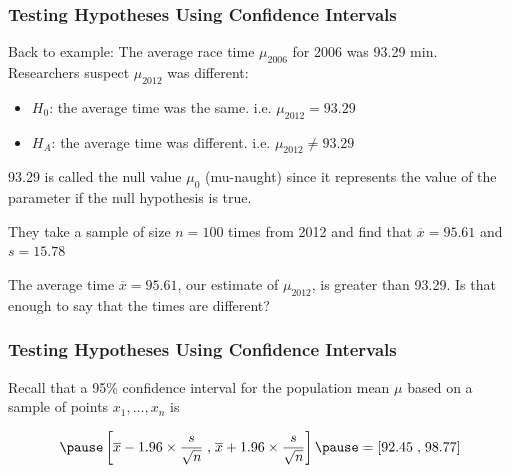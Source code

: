 \documentclass[handout]{beamer}
\newcommand{\blue}[1]{\textcolor{blue2}{#1}}
\newcommand{\xbar}{\overline{x}}
\begin{document}
\begin{frame}
\frametitle{Testing Hypotheses Using Confidence Intervals}

Back to example:  The average race time $\mu_{2006}$ for 2006 was 93.29 min.  Researchers suspect $\mu_{2012}$ was different:
\begin{itemize}
\pause \item $H_0$: the average time was the same. i.e. $\mu_{2012} = 93.29$
\pause \item $H_A$: the average time was different. i.e. $\mu_{2012} \neq 93.29$
\end{itemize}

\pause \vspace{0.5cm}

93.29 is called the \blue{null value $\mu_{0}$} (mu-naught) since it represents the value of the parameter if the null hypothesis is true.

\pause \vspace{0.5cm}

They take a sample of size $n=100$ times from 2012 and find that $\xbar=95.61$ and $s=15.78$

\pause \vspace{0.5cm}

The average time $\xbar=95.61$, our estimate of $\mu_{2012}$, is greater than 93.29.  Is that enough to say that the times are different?

\end{frame}


\begin{frame}
\frametitle{Testing Hypotheses Using Confidence Intervals}

Recall that a 95\% confidence interval for the population mean $\mu$ based on a sample of points $x_1, \ldots, x_n$ is 

\begin{eqnarray*}
\pause \left[\overline{x} - 1.96 \times\frac{s}{\sqrt n}\right.,
\left.\overline{x} + 1.96 \times\frac{s}{\sqrt n}\right]
\pause = \left[92.45\right., \left.98.77\right]
\end{eqnarray*}


\end{frame}
\end{document}
